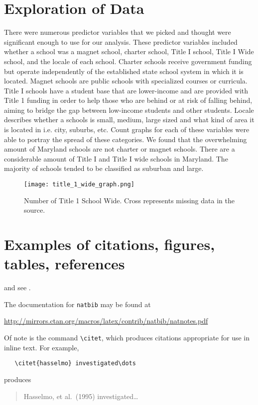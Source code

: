 \documentclass[12pt]{article}
\begin{document}
\section{Exploration of Data}
There were numerous predictor variables that we picked and thought were significant enough to use for our analysis. These predictor variables included whether a school was a magnet school, charter school, Title I school, Title I Wide school, and the locale of each school. Charter schools receive government funding but operate independently of the established state school system in which it is located. Magnet schools are public schools with specialized courses or curricula. Title I schools have a student base that are lower-income and are provided with Title 1 funding in order to help those who are behind or at risk of falling behind, aiming to bridge the gap between low-income students and other students. Locale describes whether a schools is small, medium, large sized and what kind of area it is located in i.e. city, suburbs, etc. Count graphs for each of these variables were able to portray the spread of these categories. We found that the overwhelming amount of Maryland schools are not charter or magnet schools. There are a considerable amount of Title I and Title I wide schools in Maryland. The majority of schools tended to be classified as suburban and large.

\begin{figure}[!htb]
  \centering
  \texttt{[image: title\_1\_wide\_graph.png]}
  \caption{Number of Title 1 School Wide. Cross represents missing data in the source.}
  \label{fig:title_1_wide}
\end{figure}

\section{Examples of citations, figures, tables, references}
\label{sec:others}
\lipsum[8] \cite{kour2014real,kour2014fast} and see \cite{hadash2018estimate}.

The documentation for \verb+natbib+ may be found at
\begin{center}
  \url{http://mirrors.ctan.org/macros/latex/contrib/natbib/natnotes.pdf}
\end{center}
Of note is the command \verb+\citet+, which produces citations
appropriate for use in inline text.  For example,
\begin{verbatim}
   \citet{hasselmo} investigated\dots
\end{verbatim}
produces
\begin{quote}
  Hasselmo, et al.\ (1995) investigated\dots
\end{quote}
\end{document}
